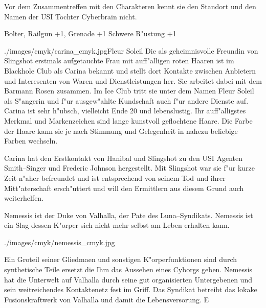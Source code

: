 Vor dem Zusammentreffen mit den Charakteren kennt sie den Standort und den Namen der USI Tochter Cyberbrain nicht.

\begin{nscsheet}[f]{\xls}
    \nscstats[ATT=3,AGG=3,DEX=2,COM=2,CON=2]
    \nscruler
    \begin{nscinventory}
        \nscitem[Waffen] Bolter, Railgun +1, Grenade +1
        \nscitem[R"ustung] Schwere R"ustung +1
    \end{nscinventory}
\end{nscsheet}



\begin{sideimagebox}[r]{0.6}{./images/cmyk/carina_cmyk.jpg}{Fleur Soleil}
    Die als geheimnisvolle Freundin von Slingshot erstmals aufgetauchte Frau mit auff"alligen roten Haaren ist im Blackhole Club als Carina bekannt und stellt dort Kontakte zwischen Anbietern und Interesenten von Waren und Dienstleistungen her. Sie arbeitet dabei mit dem Barmann Rosen zusammen. Im Ice Club tritt sie unter dem Namen Fleur Soleil als S"angerin und f"ur ausgew"ahlte Kundschaft auch f"ur andere Dienste auf. Carina ist sehr h"ubsch, vielleicht Ende 20 und lebenslustig. Ihr auff"alligstes Merkmal und Markenzeichen sind lange kunstvoll geflochtene Haare. Die Farbe der Haare kann sie je nach Stimmung und Gelegenheit in nahezu beliebige Farben wechseln.

    Carina hat den Erstkontakt von Hanibal und Slingshot zu den USI Agenten Smith--Singer und Frederic Johnson hergestellt. Mit Slingshot war sie f"ur kurze Zeit n"aher befreundet und ist entsprechend von seinem Tod und ihrer Mitt"aterschaft ersch"uttert und will den Ermittlern aus diesem Grund auch weiterhelfen.
\end{sideimagebox}
\vfill\pagebreak


Nemessis ist der Duke von Valhalla, der Pate des Luna--Syndikats. Nemessis ist ein Slag dessen K"orper sich nicht mehr selbst am Leben erhalten kann. 

\begin{sideimagebox}[r]{0.9}{./images/cmyk/nemessis_cmyk.jpg}{}

\end{sideimagebox}

Ein Gro\3teil seiner Gliedma\3en und sonstigen K"orperfunktionen sind durch synthetische Teile ersetzt die Ihm das Aussehen eines Cyborgs geben. Nemessis hat die Unterwelt auf Valhalla durch seine gut organisierten Untergebenen und sein weitreichendes Kontaktenetz
fest im Griff. Das Syndikat betreibt das lokake Fusionskraftwerk von Valhalla und damit die Lebensversorung. E

